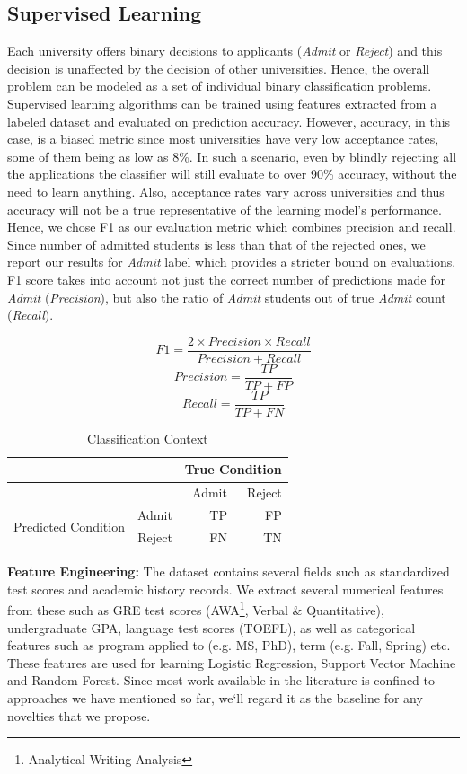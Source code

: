 \documentclass{sig-alternate-05-2015}
\begin{document}
\subsection{Supervised Learning}
\label{subsec:supervised-learning}
Each university offers binary decisions to applicants (\textit{Admit} or \textit{Reject}) and this decision is unaffected by the decision of other universities. Hence, the overall problem can be modeled as a set of individual binary classification problems. Supervised learning algorithms can be trained using features extracted from a labeled dataset and evaluated on prediction accuracy. However, accuracy, in this case, is a biased metric since most universities have very low acceptance rates, some of them being as low as 8\%. In such a scenario, even by blindly rejecting all the applications the classifier will still evaluate to over 90\% accuracy, without the need to learn anything. Also, acceptance rates vary across universities and thus accuracy will not be a true representative of the learning model's performance. Hence, we chose F1 as our evaluation metric which combines precision and recall. Since number of admitted students is less than that of the rejected ones, we report our results for \textit{Admit} label which provides a stricter bound on evaluations. F1 score takes into account not just the correct number of predictions made for \textit{Admit} (\textit{Precision}), but also the ratio of \textit{Admit} students out of true \textit{Admit} count (\textit{Recall}).

$$F1 = \frac{2 \times Precision \times Recall}{Precision + Recall}$$
$$Precision = \frac{TP}{TP + FP}$$
$$Recall = \frac{TP}{TP + FN}$$

\begin{table}[]
\centering
\caption{Classification Context}
\label{tab:classification-context}
\begin{tabular}{|l|r|r|r|}
\hline
                  &  & \multicolumn{2}{r|}{True Condition} \\ \hline
                  &  &  Admit         & Reject          \\ \hline
\multirow{2}{*}{Predicted Condition} & Admit &  TP         & FP          \\ \cline{2-4} 
                  & Reject & FN          & TN          \\ \hline
\end{tabular}
\end{table}

\textbf{Feature Engineering:}
The dataset contains several fields such as standardized test scores and academic history records. We extract several numerical features from these such as GRE test scores (AWA\footnote{Analytical Writing Analysis}, Verbal \& Quantitative), undergraduate GPA, language test scores (TOEFL), as well as categorical features such as program applied to (e.g. MS, PhD), term (e.g. Fall, Spring) etc. These features are used for learning Logistic Regression, Support Vector Machine and Random Forest. Since most work available in the literature is confined to approaches we have mentioned so far, we`ll regard it as the baseline for any novelties that we propose.
\end{document}
